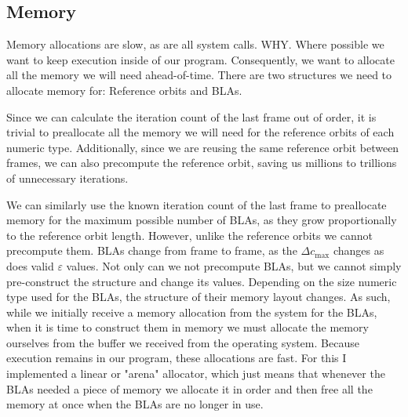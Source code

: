 \documentclass{article}
\begin{document}
\subsection{Memory}
\par Memory allocations are slow, as are all system calls. WHY. Where possible we want to keep execution inside of our program. Consequently, we want to allocate all the memory we will need ahead-of-time. There are two structures we need to allocate memory for: Reference orbits and BLAs.
\par Since we can calculate the iteration count of the last frame out of order, it is trivial to preallocate all the memory we will need for the reference orbits of each numeric type. Additionally, since we are reusing the same reference orbit between frames, we can also precompute the reference orbit, saving us millions to trillions of unnecessary iterations.
\par We can similarly use the known iteration count of the last frame to preallocate memory for the maximum possible number of BLAs, as they grow proportionally to the reference orbit length. However, unlike the reference orbits we cannot precompute them. BLAs change from frame to frame, as the $\Delta c_\text{max}$ changes as does valid $\varepsilon$ values. Not only can we not precompute BLAs, but we cannot simply pre-construct the structure and change its values. Depending on the size numeric type used for the BLAs, the structure of their memory layout changes. As such, while we initially receive a memory allocation from the system for the BLAs, when it is time to construct them in memory we must allocate the memory ourselves from the buffer we received from the operating system. Because execution remains in our program, these allocations are fast. For this I implemented a linear or "arena" allocator, which just means that whenever the BLAs needed a piece of memory we allocate it in order and then free all the memory at once when the BLAs are no longer in use.  
\end{document}

